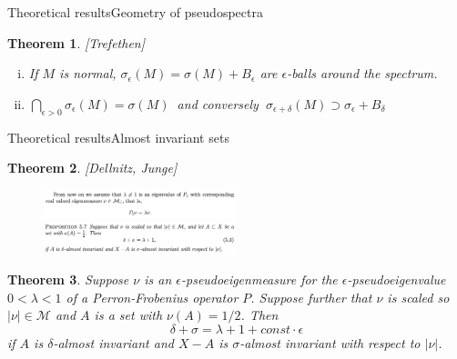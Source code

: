 \documentclass[
  english,            %
  aspectratio=169,    %
]{tumbeamer}
\newtheorem{theorem}{Theorem}
\newcommand{\cM}{\mathcal{M}}
\begin{document}
\begin{frame}{Theoretical results}{Geometry of pseudospectra}
  
\begin{theorem} 
  
  [Trefethen]


  \begin{enumerate}[(i)]
    \item If $M$ is normal, $ \sigma_\epsilon (M) =  \sigma (M) + B_\epsilon $ are $\epsilon$-balls around the spectrum.  \vspace*{10ex}
    
    \item $ \bigcap_{\epsilon > 0} \sigma_\epsilon (M) = \sigma (M)\ $ and conversely $\ \sigma_{\epsilon + \delta} (M) \supset \sigma_\epsilon + B_\delta $
  \end{enumerate}
\end{theorem}

\end{frame}

\begin{frame}{Theoretical results}{Almost invariant sets}
  
\begin{theorem}

  [Dellnitz, Junge]
\end{theorem}
\begin{figure}
  \centering
  \includegraphics[width=0.5\textwidth]{almost_inv_1.png}
  \includegraphics[width=0.5\textwidth]{almost_inv_2.png}
\end{figure}

\begin{theorem}
  Suppose $\nu$ is an $\epsilon$-pseudoeigenmeasure for the $\epsilon$-pseudoeigenvalue $0 < \lambda < 1$ of a Perron-Frobenius operator $P$. Suppose further that $\nu$ is scaled so $| \nu | \in \cM$ and $A$ is a set with $\nu (A) = 1/2$. Then 
  \begin{equation}
    \delta + \sigma = \lambda + 1 + const \cdot \epsilon
  \end{equation}
  if $A$ is $\delta$-almost invariant and $X - A$ is $\sigma$-almost invariant with respect to $| \nu |$. 
\end{theorem}

\end{frame}
\end{document}
